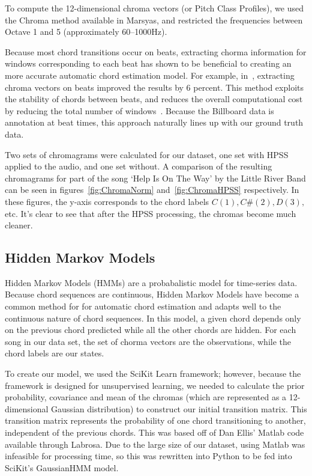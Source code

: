 \documentclass{article}
\begin{document}
To compute the 12-dimensional chroma vectors (or Pitch Class Profiles), we used
the Chroma method available in Marsyas, and restricted the frequencies between
Octave 1 and 5 (approximately 60--1000Hz).

Because most chord transitions occur on beats, extracting chorma information for
windows corresponding to each beat has shown to be beneficial to creating an
more accurate automatic chord estimation model. For example, in~\cite{Zenz:20},
extracting chroma vectors on beats improved the results by 6 percent. This method
exploits the stability of chords between beats, and reduces the overall computational
cost by reducing the total number of windows~\cite{McVicor:00}. Because the Billboard
data is annotation at beat times, this approach naturally lines up with our ground truth data.

Two sets of chromagrams were calculated for our dataset, one set with HPSS
applied to the audio, and one set without. A comparison of the resulting
chromagrams for part of the song `Help Is On The Way' by the Little River Band
can be seen in figures~\ref{fig:ChromaNorm} and~\ref{fig:ChromaHPSS}
respectively. In these figures, the y-axis corresponds to the chord labels
$ C(1), C\#(2), D(3), $ etc. It's clear to see that after the HPSS processing, the
chromas become much cleaner.

\subsection{Hidden Markov Models}

Hidden Markov Models (HMMs) are a probabalistic model for time-series data. Because chord
sequences are continuous,  Hidden Markov Models have become a common method for
for automatic chord estimation and adapts well to the continuous nature of chord sequences.
In this model, a given chord depends only on the previous chord predicted while all the other chords
are hidden. For each song in our data set, the set of chorma vectors are the observations,
while the chord labels are our states.

To create our model, we used the SciKit Learn framework; however, because the
framework is designed for unsupervised learning, we needed to calculate the
prior probability, covariance and mean of the chromas  (which are represented as
a 12-dimensional Gaussian distribution) to construct our initial transition
matrix.  This transition matrix represents the probability of one chord
transitioning to another, independent of the previous chords.  This was based
off of Dan Ellis' Matlab code available through Labrosa. Due to the large size
of our dataset, using Matlab was infeasible for processing time, so this was
rewritten into Python to be fed into SciKit's GaussianHMM model.
\end{document}
